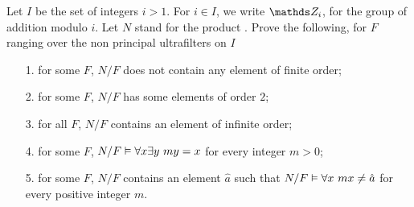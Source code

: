 \documentclass[creche.tex]{subfiles}
\begin{document}
\begin{exercise}
Let $I$ be the set of integers $i>1$. For $i\in I$, we write $\ZZ_i$, for the group of addition modulo $i$.  Let $N$ stand for the product . Prove the following, for $F$ ranging over the non principal ultrafilters on $I$

\begin{itemize}
\item[1.] for some $F$, $N/F$ does not contain any element of finite order;
\item[2.] for some $F$, $N/F$ has some elements of order $2$;
\item[3.] for all $F$, $N/F$ contains an element of infinite order;
\item[4.] for some $F$, $N/F\vDash \forall x\exists y\ my=x$ for every integer $m>0$;
\item[5.] for some $F$, $N/F$ contains an element $\hat a$ such that $N/F\vDash \forall x\ mx\neq\hat a$ for every positive integer $m$.\QED
\end{itemize}
\begin{comment}
\textbf{Soluzione.} Dimostriamo \ssf{1} osservando che $\ZZ_i\models\neg\E x\,[x\neq 0 \wedge mx=0]$  per ogni intero $m$ ed ogni primo $i\nmid m$. Quindi, se $F$ \`e un un ultrafiltro non principale che contiene l'insieme dei numeri primi, $N/F\models\neg\E x\,[x\neq 0 \wedge mx=0]$ per ogni $m$. Per dimostrare \ssf{2} osserviamo che $\ZZ_{2i}\models\E x\,[x\neq 0 \wedge 2x=0]$ per ogni $i$. Quindi se $F$ contiene l'insieme dei numeri pari, $N/F$ contiene un elemento di ordine 2. Per dimostrare \ssf{3} sia $\hat a\in N$ la sequenza che ha valore costante $1$. Chiaramente $\ZZ_i\models m\neq0$ per ogni intero positivo $m$ ed ogni $i>m$. Quindi, se $F$ contiene il filtro di Fr\'echet, $N/F\models m [\hat a]_F\neq 0$ per ogni intero positivo $m$. Dimostriamo \ssf{4} osservando che  $\ZZ_i\models\A x\,\E y\ my=x$ per ogni intero $m$ ed ogni primo $i\nmid m$. Quindi se $F$ \`e un ultrafiltro non principale che contiene l'insieme dei numeri primi,  $N/F\models\A x\,\E y\ my=x$ per ogni $m$. Dimostriamo \ssf{5}. Sia $F$ un ultrafiltro non principale che contiene l'insieme $\{i\,!:i\in I\}$ e sia $\hat a$ la sequenza che ha valore costante $1$. Poich\'e $\ZZ_{i\,!}\models\neg\E x\ mx=1$ per ogni $i>m$, otteniamo $N/F\models\neg\E x\ mx=[\hat a]_F$ per ogni $m>1$.
\end{comment}
\end{exercise}
\end{document}
